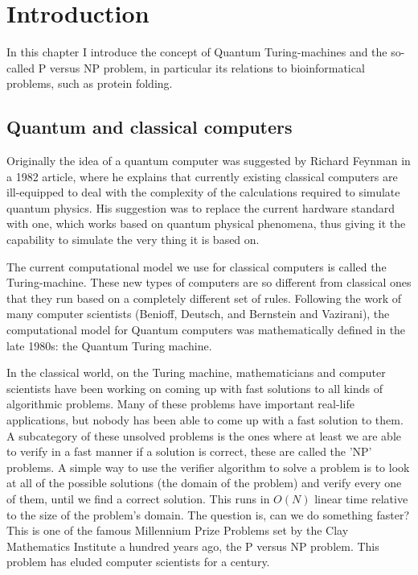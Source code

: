 \chapter{Introduction}

In this chapter I introduce the concept of Quantum Turing-machines and the so-called P versus NP problem, in particular its relations to bioinformatical problems, such as protein folding.

\section{Quantum and classical computers}

Originally the idea of a quantum computer was suggested by Richard Feynman in a 1982 article\cite{feynman_simulating_1982}, where he explains that currently existing classical computers are ill-equipped to deal with the complexity of the calculations required to simulate quantum physics. His suggestion was to replace the current hardware standard with one, which works based on quantum physical phenomena, thus giving it the capability to simulate the very thing it is based on.

The current computational model we use for classical computers is called the Turing-machine. These new types of computers are so different from classical ones that they run based on a completely different set of rules. Following the work of many computer scientists (Benioff\cite{benioff_models_1998}, Deutsch\cite{deutsch_quantum_1985}, and Bernstein and Vazirani\cite{bernstein_quantum_1993}), the computational model for Quantum computers was mathematically defined in the late 1980s: the Quantum Turing machine.

In the classical world, on the Turing machine, mathematicians and computer scientists have been working on coming up with fast solutions to all kinds of algorithmic problems. Many of these problems have important real-life applications, but nobody has been able to come up with a fast solution to them. A subcategory of these unsolved problems is the ones where at least we are able to verify in a fast manner if a solution is correct, these are called the 'NP' problems. A simple way to use the verifier algorithm to solve a problem is to look at all of the possible solutions (the domain of the problem) and verify every one of them, until we find a correct solution. This runs in $O(N)$ linear time relative to the size of the problem's domain. The question is, can we do something faster? This is one of the famous Millennium Prize Problems set by the Clay Mathematics Institute a hundred years ago, the P versus NP problem. This problem has eluded computer scientists for a century.

